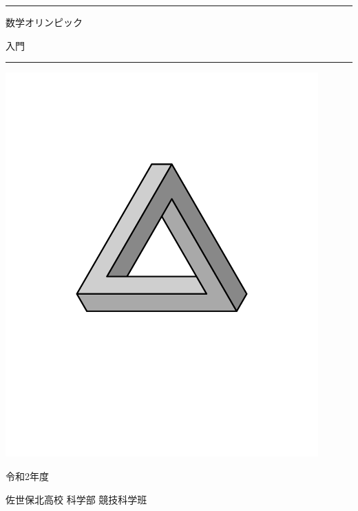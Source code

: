 \documentclass[uplatex,dvipdfmx]{jsbook}
\begin{document}
\begin{titlepage}
    \begin{center}
        \hrule height 2pt

        \vspace{10pt}

        {\fontsize{60pt}{3pt}\selectfont 数学オリンピック}

        \vspace{10pt}

        {\fontsize{60pt}{3pt}\selectfont 入門}

        \vspace{10pt}

        \hrule height 2pt

        \vspace{70pt}

        \includegraphics[clip,width=12cm]{figures/PenroseTriangle.pdf}

        \vspace{70pt}

        {\Large 令和2年度}

        \vspace{30pt}

        {\LARGE 佐世保北高校 科学部 競技科学班}
    \end{center}
\end{titlepage}
\end{document}
